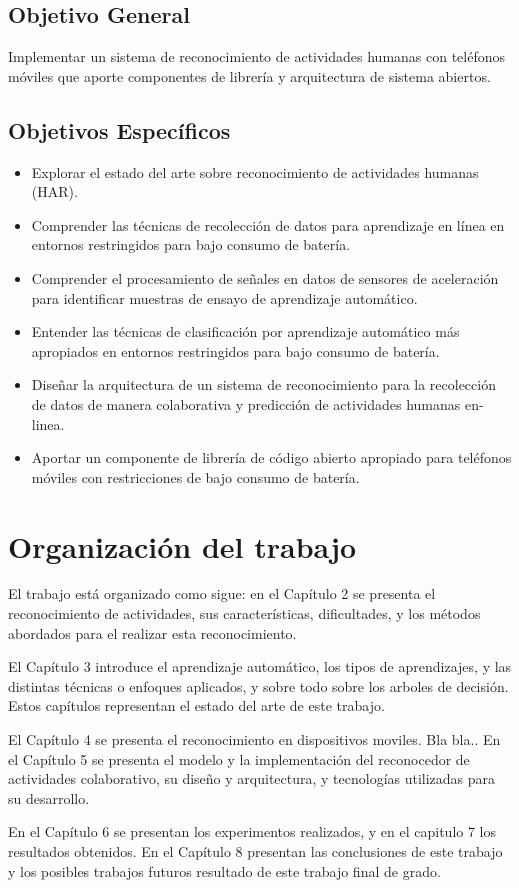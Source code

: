 \subsection{Objetivo General}

\label{objetivo-general}

Implementar un sistema de reconocimiento de actividades humanas con
teléfonos móviles que aporte componentes de librería y arquitectura
de sistema abiertos.

\subsection{Objetivos Específicos}

\label{objetivos-especuxedficos}
\begin{itemize}
\item Explorar el estado del arte sobre reconocimiento de actividades humanas
(HAR). 
\item Comprender las técnicas de recolección de datos para aprendizaje en
línea en entornos restringidos para bajo consumo de batería. 
\item Comprender el procesamiento de señales en datos de sensores de aceleración
para identificar muestras de ensayo de aprendizaje automático. 
\item Entender las técnicas de clasificación por aprendizaje automático
más apropiados en entornos restringidos para bajo consumo de batería. 
\item Diseñar la arquitectura de un sistema de reconocimiento para la recolección
de datos de manera colaborativa y predicción de actividades humanas
en-linea. 
\item Aportar un componente de librería de código abierto apropiado para
teléfonos móviles con restricciones de bajo consumo de batería. 
\end{itemize}

\section{Organización del trabajo}

\label{organizaciuxf3n-del-trabajo}

El trabajo está organizado como sigue: en el Capítulo 2 se presenta
el reconocimiento de actividades, sus características, dificultades,
y los métodos abordados para el realizar esta reconocimiento.

El Capítulo 3 introduce el aprendizaje automático, los tipos de aprendizajes,
y las distintas técnicas o enfoques aplicados, y sobre todo sobre
los arboles de decisión. Estos capítulos representan el estado del
arte de este trabajo.

El Capítulo 4 se presenta el reconocimiento en dispositivos moviles.
Bla bla.. En el Capítulo 5 se presenta el modelo y la implementación
del reconocedor de actividades colaborativo, su diseño y arquitectura,
y tecnologías utilizadas para su desarrollo.

En el Capítulo 6 se presentan los experimentos realizados, y en el
capitulo 7 los resultados obtenidos. En el Capítulo 8 presentan las
conclusiones de este trabajo y los posibles trabajos futuros resultado
de este trabajo final de grado. 
